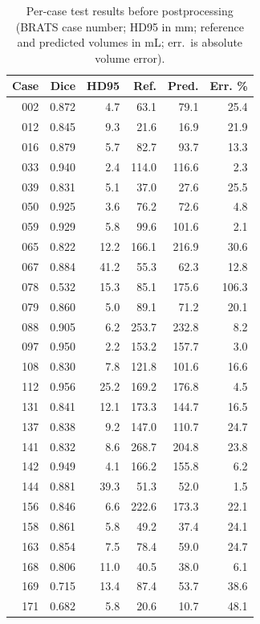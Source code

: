 \begin{table}[H]
\centering
\caption{Per-case test results before postprocessing (BRATS case number; HD95 in mm; reference and predicted volumes in mL; err.\ is absolute volume error).\label{tab:percase}}
\tiny
\begin{minipage}{0.45\linewidth}
\centering
\begin{tabular}{rrrrrr}
\toprule
Case & Dice & HD95 & Ref. & Pred. & Err. \%\\
\midrule
002 & 0.872 & 4.7 & 63.1 & 79.1 & 25.4\\
012 & 0.845 & 9.3 & 21.6 & 16.9 & 21.9\\
016 & 0.879 & 5.7 & 82.7 & 93.7 & 13.3\\
033 & 0.940 & 2.4 & 114.0 & 116.6 & 2.3\\
039 & 0.831 & 5.1 & 37.0 & 27.6 & 25.5\\
050 & 0.925 & 3.6 & 76.2 & 72.6 & 4.8\\
059 & 0.929 & 5.8 & 99.6 & 101.6 & 2.1\\
065 & 0.822 & 12.2 & 166.1 & 216.9 & 30.6\\
067 & 0.884 & 41.2 & 55.3 & 62.3 & 12.8\\
078 & 0.532 & 15.3 & 85.1 & 175.6 & 106.3\\
079 & 0.860 & 5.0 & 89.1 & 71.2 & 20.1\\
088 & 0.905 & 6.2 & 253.7 & 232.8 & 8.2\\
097 & 0.950 & 2.2 & 153.2 & 157.7 & 3.0\\
108 & 0.830 & 7.8 & 121.8 & 101.6 & 16.6\\
112 & 0.956 & 25.2 & 169.2 & 176.8 & 4.5\\
131 & 0.841 & 12.1 & 173.3 & 144.7 & 16.5\\
137 & 0.838 & 9.2 & 147.0 & 110.7 & 24.7\\
141 & 0.832 & 8.6 & 268.7 & 204.8 & 23.8\\
142 & 0.949 & 4.1 & 166.2 & 155.8 & 6.2\\
144 & 0.881 & 39.3 & 51.3 & 52.0 & 1.5\\
156 & 0.846 & 6.6 & 222.6 & 173.3 & 22.1\\
158 & 0.861 & 5.8 & 49.2 & 37.4 & 24.1\\
163 & 0.854 & 7.5 & 78.4 & 59.0 & 24.7\\
168 & 0.806 & 11.0 & 40.5 & 38.0 & 6.1\\
169 & 0.715 & 13.4 & 87.4 & 53.7 & 38.6\\
171 & 0.682 & 5.8 & 20.6 & 10.7 & 48.1\\

\end{tabular}
\end{minipage}
\end{table}
